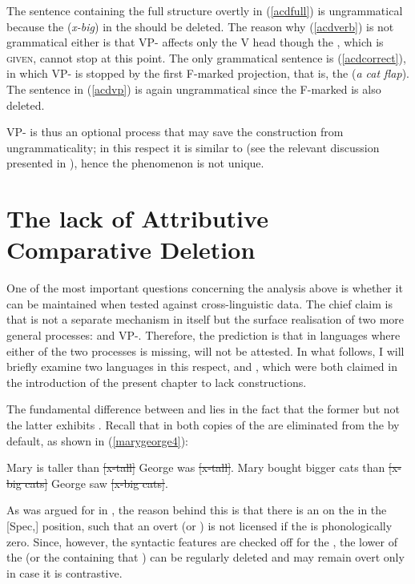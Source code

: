 The sentence containing the full structure overtly in (\ref{acdfull}) is ungrammatical because the  (\textit{x-big}) in the  should be deleted. The reason why (\ref{acdverb}) is not grammatical either is that VP- affects only the V head though the , which is \textsc{given}, cannot stop  at this point. The only grammatical sentence is (\ref{acdcorrect}), in which VP- is stopped by the first F-marked projection, that is, the  (\textit{a cat flap}). The sentence in (\ref{acdvp}) is again ungrammatical since the F-marked  is also deleted.

VP- is thus an optional process that may save the construction from ungrammaticality; in this respect it is similar to  (see the relevant discussion presented in ), hence the phenomenon is not unique.

\section{The lack of Attributive Comparative Deletion} \label{sec:4lack}
One of the most important questions concerning the analysis above is whether it can be maintained when tested against cross-linguistic data. The chief claim is that  is not a separate mechanism in itself but the surface realisation of two more general processes:  and VP-. Therefore, the prediction is that in languages where either of the two processes is missing,  will not be attested. In what follows, I will briefly examine two languages in this respect,  and , which were both claimed in the introduction of the present chapter to lack  constructions.

The fundamental difference between  and  lies in the fact that the former but not the latter exhibits . Recall that in  both copies of the  are eliminated from the  by default, as shown in (\ref{marygeorge4}):

\ea \label{marygeorge4}
\ea Mary is taller than \sout{[x-tall]} George was \sout{[x-tall]}.
\ex	Mary bought bigger cats than \sout{[x-big cats]} George saw \sout{[x-big cats]}.
\z
\z

As was argued for in , the reason behind this is that there is an  on the  in the [Spec,] position, such that an overt  (or ) is not licensed if the  is phonologically zero. Since, however, the syntactic features are checked off for the , the lower  of the  (or the  containing that ) can be regularly deleted and may remain overt only in case it is contrastive.

